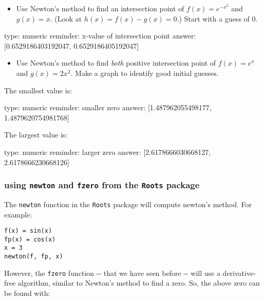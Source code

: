 \documentclass[12pt]{article}
\begin{document}
\begin{itemize}
\itemsep1pt\parskip0pt
\item
  Use Newton's method to find an intersection point of
  $f(x) =   e^{-x^2}$ and $g(x)=x$. (Look at $h(x) = f(x) - g(x) = 0$.)
  Start with a guess of $0$.
\end{itemize}

\begin{answer}
    type: numeric
    reminder: x-value of intersection point
    answer: [0.6529186403192047, 0.6529186405192047]

\end{answer}

\begin{itemize}
\itemsep1pt\parskip0pt
\item
  Use Newton's method to find \emph{both} positive intersection point of
  $f(x) = e^x$ and $g(x) = 2x^2$. Make a graph to identify good initial
  guesses.
\end{itemize}

The smallest value is:

\begin{answer}
    type: numeric
    reminder: smaller zero
    answer: [1.487962055498177, 1.4879620754981768]

\end{answer}

The largest value is:

\begin{answer}
    type: numeric
    reminder: larger zero
    answer: [2.6178666030668127, 2.6178666230668126]

\end{answer}

\subsubsection{using \texttt{newton} and \texttt{fzero} from the
\texttt{Roots} package}

The \texttt{newton} function in the \texttt{Roots} package will compute
newton's method. For example:



\begin{verbatim}
f(x) = sin(x)
fp(x) = cos(x)
x = 3
newton(f, fp, x)
\end{verbatim}
However, the \texttt{fzero} function -{}- that we have seen before -{}-
will use a derivative-free algorithm, similar to Newton's method to find
a zero. So, the above zero can be found with:
\end{document}
